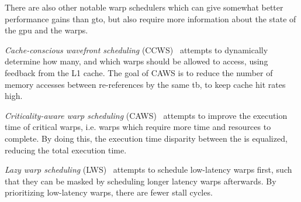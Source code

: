 There are also other notable warp schedulers which can give somewhat better performance gains than \acrshort{gto}, but also require more information about the state of the \acrshort{gpu} and the warps.

\textit{Cache-conscious wavefront scheduling} (CCWS)~\cite{cache-conscious_wavefront_scheduling} attempts to dynamically determine how many, and which warps should be allowed to access, using feedback from the L1 cache. The goal of CAWS is to reduce the number of memory accesses between re-references by the same \acrshort{tb}, to keep cache hit rates high.

\textit{Criticality-aware warp scheduling} (CAWS)~\cite{caws} attempts to improve the execution time of critical warps, i.e. warps which require more time and resources to complete. By doing this, the execution time disparity between the  is equalized, reducing the total execution time.

\textit{Lazy warp scheduling} (LWS)~\cite{improving_gpgpu_scheduling} attempts to schedule low-latency warps first, such that they can be masked by scheduling longer latency warps afterwards. By prioritizing low-latency warps, there are fewer stall cycles.

